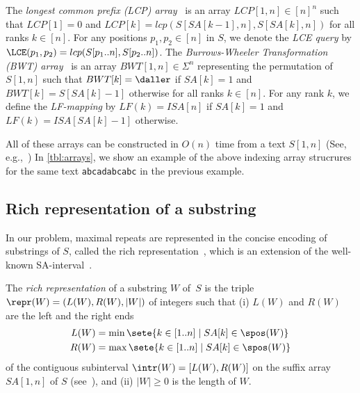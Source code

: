 The \textit{longest common prefix (LCP) array}~\cite{manber:myers1993suffixarrays,kasai:lee2001lcp:linear} is an array $LCP[1,n] \in [n]^n$ such that $LCP[1] = 0$ and $LCP[k] = lcp(S[SA[k-1],n], S[SA[k],n])$ for all ranks $k \in [n]$. For any positions $p_1, p_2 \in [n]$ in $S$, we denote the \textit{LCE query} by $\LCE(p_1, p_2) = lcp(S[p_1..n], S[p_2..n])$. 
The \textit{Burrows-Wheeler Transformation (BWT) array}~\cite{burrows:wheeler1994blocksorting} is an array $BWT[1,n] \in \Sigma^n$ representing the permutation of $S[1,n]$ such that $BWT[k] = \daller$ if $SA[k] = 1$ and $BWT[k] = S[SA[k]-1]$ otherwise for all ranks $k \in [n]$. 
For any rank $k$, we define the \textit{LF-mapping} by $LF(k) = ISA[n]$ if $SA[k]=1$ and $LF(k) = ISA[SA[k]-1]$ otherwise. 

All of these arrays can be constructed in $O(n)$ time from a text $S[1,n]$ (See, e.g.,~\cite{navarro2016cds:book})
In \cref{tbl:arrays}, we show an example of the above indexing array strucrures for the same text \texttt{abcadabcabc\daller} in the previous example.  

\subsection{Rich representation of a substring}
In our problem, maximal repeats are represented in the concise encoding of substrings of $S$, called the rich representation~\cite{kasai:lee2001lcp:linear,abouelhoda2004replacing,belazzougui2020linear}, which is an extension of the well-known SA-interval~\cite{manber:myers1993suffixarrays}. 

\begin{definition}
The \textit{rich representation} of a substring $W$ of~$S$
is the triple $\repr(W) = (L(W), R(W), |W|)$ of integers such that
(i) $L(W)$ and $R(W)$ are the left and the right ends 
  \begin{align*}
    L(W) &= \min\sete{ k \in [1..n] \mid SA[k] \in \spos(W)  }
  \\R(W) &= \max\sete{ k \in [1..n] \mid SA[k] \in \spos(W)  }
  \end{align*}
of the contiguous subinterval $\intr(W) = [L(W), R(W)]$ on the suffix array $SA[1,n]$ of $S$ (see~\cite{abouelhoda2004replacing,kasai:lee2001lcp:linear,belazzougui2020linear}), and
(ii) $|W| \ge 0$ is the length of $W$.
\end{definition}

